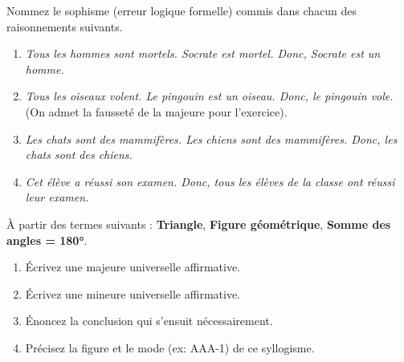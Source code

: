 \documentclass[11pt]{article}
\begin{document}
\begin{exercice}
Nommez le sophisme (erreur logique formelle) commis dans chacun des raisonnements suivants.
\begin{enumerate}
    \item \textit{Tous les hommes sont mortels. Socrate est mortel. Donc, Socrate est un homme.}
    \item \textit{Tous les oiseaux volent. Le pingouin est un oiseau. Donc, le pingouin vole.} (On admet la fausseté de la majeure pour l'exercice).
    \item \textit{Les chats sont des mammifères. Les chiens sont des mammifères. Donc, les chats sont des chiens.}
    \item \textit{Cet élève a réussi son examen. Donc, tous les élèves de la classe ont réussi leur examen.}
\end{enumerate}
\end{exercice}

\begin{exercice}
À partir des termes suivants : \textbf{Triangle}, \textbf{Figure géométrique}, \textbf{Somme des angles = 180°}.
\begin{enumerate}
    \item Écrivez une majeure universelle affirmative.
    \item Écrivez une mineure universelle affirmative.
    \item Énoncez la conclusion qui s'ensuit nécessairement.
    \item Précisez la figure et le mode (ex: AAA-1) de ce syllogisme.
\end{enumerate}
\end{exercice}
\end{document}
